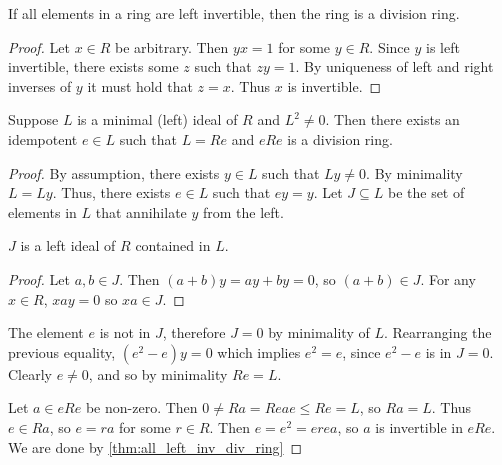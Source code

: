 \begin{theorem}
  \label{thm:all_left_inv_div_ring}
  \leanok
  If all elements in a ring are left invertible, then the ring is a division ring.
\end{theorem}
\begin{proof}
  \leanok
  Let $x \in R$ be arbitrary. Then $yx = 1$ for some $y \in R$. Since $y$ is left invertible, there exists some $z$ such that $zy = 1$. By uniqueness of left and right inverses of $y$ it must hold that $z = x$. Thus $x$ is invertible.
\end{proof}

\begin{theorem}
  \label{thm:brauer_lemma}
  \leanok
  Suppose $L$ is a minimal (left) ideal of $R$ and $L^2 \neq 0$. Then there exists an idempotent $e \in L$ such that $L = Re$ and $eRe$ is a division ring.
\end{theorem}
\begin{proof}
  \leanok
  By assumption, there exists $y \in L$ such that $Ly \neq 0$. By minimality $L = Ly$. Thus, there exists $e \in L$ such that $e y = y$. Let $J \subseteq L$ be the set of elements in $L$ that annihilate $y$ from the left.
  \begin{claim}
    $J$ is a left ideal of $R$ contained in $L$.
  \end{claim}
  \begin{proof}
    \leanok
    Let $a, b \in J$. Then $(a + b) y = a y + b y = 0$, so $(a + b) \in J$. For any $x \in R$, $x a y = 0$ so $xa \in J$.
  \end{proof}
  The element $e$ is not in $J$, therefore $J = 0$ by minimality of $L$.
  Rearranging the previous equality, $(e^2 - e) y = 0$ which implies $e^2 = e$, since $e^2 - e$ is in $J = 0$. Clearly $e \neq 0$, and so by minimality $Re = L$.

  Let $a \in eRe$ be non-zero. Then $0 \neq Ra = Reae \leq Re = L$, so $Ra = L$. Thus $e \in Ra$, so $e = r a$ for some $r \in R$. Then $e = e^2 = e r e a$, so $a$ is invertible in $eRe$. We are done by \ref{thm:all_left_inv_div_ring}
\end{proof}

